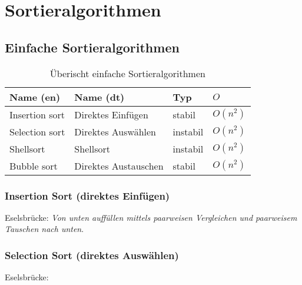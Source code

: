 



\section{Sortieralgorithmen}

\subsection{Einfache Sortieralgorithmen}

\begin{table}[h!]
        \centering
        \begin{tabular}{l l l l}
                Name (en)
			& Name (dt) 
			& Typ
			& $O$ \\
                \hline
                Insertion sort
			& Direktes Einfügen
			& stabil       
			& $O(n^2)$ \\
                Selection sort 
			& Direktes Auswählen      
			& instabil       
			& $O(n^2)$ \\
                Shellsort   
			& Shellsort    
			& instabil       
			& $O(n^2)$ \\
                Bubble sort   
			& Direktes Austauschen   
			& stabil        
			& $O(n^2)$
        \end{tabular}
        \caption{Überischt einfache Sortieralgorithmen}
        \label{table:sorting-algorithms}
\end{table}

\subsubsection{Insertion Sort (direktes Einfügen)}
Eselsbrücke: \emph{Von unten auffüllen mittels paarweisen Vergleichen 
und paarweisem Tauschen nach unten}.




\subsubsection{Selection Sort (direktes Auswählen)}
Eselsbrücke: \emph{}
